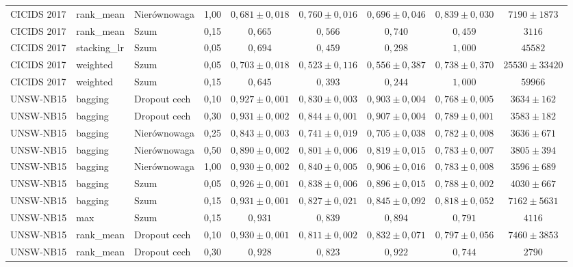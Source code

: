 \begin{table}[H]
{\begin{tabular}{llllccccc}
CICIDS 2017 & rank\_mean & Nierównowaga & 1{,}00 & $0{,}681 \pm 0{,}018$ & $0{,}760 \pm 0{,}016$ & $0{,}696 \pm 0{,}046$ & $0{,}839 \pm 0{,}030$ & $7190 \pm 1873$ \\
CICIDS 2017 & rank\_mean & Szum & 0{,}15 & $0{,}665$ & $0{,}566$ & $0{,}740$ & $0{,}459$ & $3116$ \\
CICIDS 2017 & stacking\_lr & Szum & 0{,}05 & $0{,}694$ & $0{,}459$ & $0{,}298$ & $1{,}000$ & $45582$ \\
CICIDS 2017 & weighted & Szum & 0{,}05 & $0{,}703 \pm 0{,}018$ & $0{,}523 \pm 0{,}116$ & $0{,}556 \pm 0{,}387$ & $0{,}738 \pm 0{,}370$ & $25530 \pm 33420$ \\
CICIDS 2017 & weighted & Szum & 0{,}15 & $0{,}645$ & $0{,}393$ & $0{,}244$ & $1{,}000$ & $59966$ \\
\hline
UNSW-NB15 & bagging & Dropout cech & 0{,}10 & $0{,}927 \pm 0{,}001$ & $0{,}830 \pm 0{,}003$ & $0{,}903 \pm 0{,}004$ & $0{,}768 \pm 0{,}005$ & $3634 \pm 162$ \\
UNSW-NB15 & bagging & Dropout cech & 0{,}30 & $0{,}931 \pm 0{,}002$ & $0{,}844 \pm 0{,}001$ & $0{,}907 \pm 0{,}004$ & $0{,}789 \pm 0{,}001$ & $3583 \pm 182$ \\
UNSW-NB15 & bagging & Nierównowaga & 0{,}25 & $0{,}843 \pm 0{,}003$ & $0{,}741 \pm 0{,}019$ & $0{,}705 \pm 0{,}038$ & $0{,}782 \pm 0{,}008$ & $3636 \pm 671$ \\
UNSW-NB15 & bagging & Nierównowaga & 0{,}50 & $0{,}890 \pm 0{,}002$ & $0{,}801 \pm 0{,}006$ & $0{,}819 \pm 0{,}015$ & $0{,}783 \pm 0{,}007$ & $3805 \pm 394$ \\
UNSW-NB15 & bagging & Nierównowaga & 1{,}00 & $0{,}930 \pm 0{,}002$ & $0{,}840 \pm 0{,}005$ & $0{,}906 \pm 0{,}016$ & $0{,}783 \pm 0{,}008$ & $3596 \pm 689$ \\
UNSW-NB15 & bagging & Szum & 0{,}05 & $0{,}926 \pm 0{,}001$ & $0{,}838 \pm 0{,}006$ & $0{,}896 \pm 0{,}015$ & $0{,}788 \pm 0{,}002$ & $4030 \pm 667$ \\
UNSW-NB15 & bagging & Szum & 0{,}15 & $0{,}931 \pm 0{,}001$ & $0{,}827 \pm 0{,}021$ & $0{,}845 \pm 0{,}092$ & $0{,}818 \pm 0{,}052$ & $7162 \pm 5631$ \\
UNSW-NB15 & max & Szum & 0{,}15 & $0{,}931$ & $0{,}839$ & $0{,}894$ & $0{,}791$ & $4116$ \\
UNSW-NB15 & rank\_mean & Dropout cech & 0{,}10 & $0{,}930 \pm 0{,}001$ & $0{,}811 \pm 0{,}002$ & $0{,}832 \pm 0{,}071$ & $0{,}797 \pm 0{,}056$ & $7460 \pm 3853$ \\
UNSW-NB15 & rank\_mean & Dropout cech & 0{,}30 & $0{,}928$ & $0{,}823$ & $0{,}922$ & $0{,}744$ & $2790$ \\

\end{tabular}}
\end{table}
